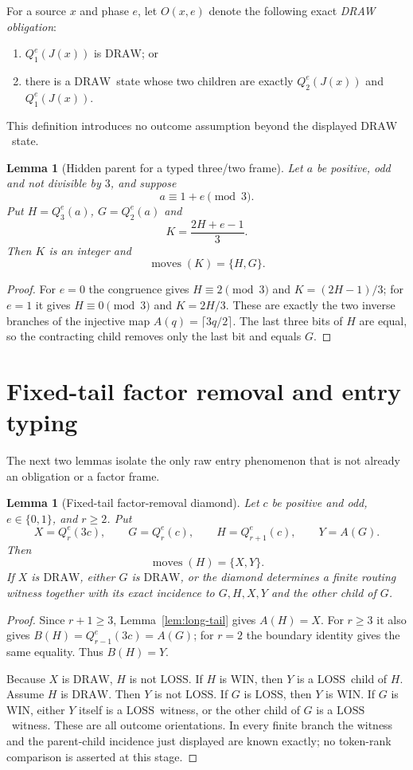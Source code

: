 \documentclass[11pt]{article}
\newtheorem{lemma}[theorem]{Lemma}
\newcommand{\WIN}{\ensuremath{\mathrm{WIN}}}
\newcommand{\LOSS}{\ensuremath{\mathrm{LOSS}}}
\newcommand{\DRAW}{\ensuremath{\mathrm{DRAW}}}
\newcommand{\Moves}{\operatorname{moves}}
\begin{document}
For a source $x$ and phase $e$, let $O(x,e)$ denote the following exact
\emph{DRAW obligation}:
\begin{enumerate}[label=(\alph*)]
\item $Q_1^e(J(x))$ is \DRAW; or
\item there is a \DRAW\ state whose two children are exactly
      $Q_2^e(J(x))$ and $Q_1^e(J(x))$.
\end{enumerate}
This definition introduces no outcome assumption beyond the displayed
\DRAW\ state.

\begin{lemma}[Hidden parent for a typed three/two frame]\label{lem:hidden-parent}
Let $a$ be positive, odd and not divisible by $3$, and suppose
\[
  a\equiv1+e\pmod3.
\]
Put $H=Q_3^e(a)$, $G=Q_2^e(a)$ and
\[
  K=\frac{2H+e-1}{3}.
\]
Then $K$ is an integer and
\[
  \Moves(K)=\{H,G\}.
\]
\end{lemma}

\begin{proof}
For $e=0$ the congruence gives $H\equiv2\pmod3$ and
$K=(2H-1)/3$; for $e=1$ it gives $H\equiv0\pmod3$ and $K=2H/3$.
These are exactly the two inverse branches of the injective map
$A(q)=\lceil3q/2\rceil$. The last three bits of $H$ are equal, so the
contracting child removes only the last bit and equals $G$.
\end{proof}

\section{Fixed-tail factor removal and entry typing}

The next two lemmas isolate the only raw entry phenomenon that is not already
an obligation or a factor frame.

\begin{lemma}[Fixed-tail factor-removal diamond]\label{lem:fixed-tail-factor}
Let $c$ be positive and odd, $e\in\{0,1\}$, and $r\ge2$. Put
\[
  X=Q_r^e(3c),\qquad G=Q_r^e(c),\qquad H=Q_{r+1}^e(c),\qquad Y=A(G).
\]
Then
\[
  \Moves(H)=\{X,Y\}.
\]
If $X$ is \DRAW, either $G$ is \DRAW, or the diamond determines a finite
routing witness together with its exact incidence to $G,H,X,Y$ and the other
child of $G$.
\end{lemma}

\begin{proof}
Since $r+1\ge3$, Lemma~\ref{lem:long-tail} gives $A(H)=X$. For $r\ge3$ it
also gives $B(H)=Q_{r-1}^e(3c)=A(G)$; for $r=2$ the boundary identity gives
the same equality. Thus $B(H)=Y$.

Because $X$ is \DRAW, $H$ is not \LOSS. If $H$ is \WIN, then $Y$ is a
\LOSS\ child of $H$. Assume $H$ is \DRAW. Then $Y$ is not \LOSS. If $G$ is
\LOSS, then $Y$ is \WIN. If $G$ is \WIN, either $Y$ itself is a \LOSS\
witness, or the other child of $G$ is a \LOSS\ witness. These are all outcome
orientations. In every finite branch the witness and the parent-child
incidence just displayed are known exactly; no token-rank comparison is
asserted at this stage.
\end{proof}
\end{document}
